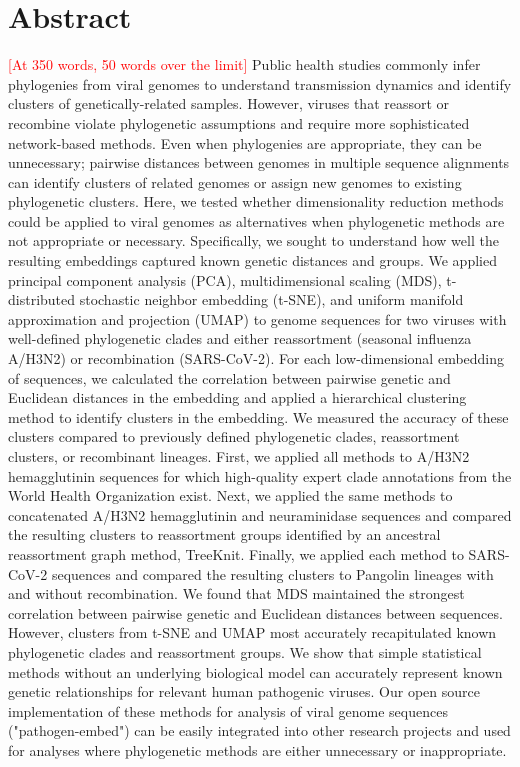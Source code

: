 \documentclass[10pt,letterpaper]{article}
\def\jhc#1{\textcolor{red}{[#1]}}
\begin{document}
\section*{Abstract}
\jhc{At 350 words, 50 words over the limit}
Public health studies commonly infer phylogenies from viral genomes to understand transmission dynamics and identify clusters of genetically-related samples.
However, viruses that reassort or recombine violate phylogenetic assumptions and require more sophisticated network-based methods.
Even when phylogenies are appropriate, they can be unnecessary; pairwise distances between genomes in multiple sequence alignments can identify clusters of related genomes or assign new genomes to existing phylogenetic clusters.
Here, we tested whether dimensionality reduction methods could be applied to viral genomes as alternatives when phylogenetic methods are not appropriate or necessary.
Specifically, we sought to understand how well the resulting embeddings captured known genetic distances and groups.
We applied principal component analysis (PCA), multidimensional scaling (MDS), t-distributed stochastic neighbor embedding (t-SNE), and uniform manifold approximation and projection (UMAP) to genome sequences for two viruses with well-defined phylogenetic clades and either reassortment (seasonal influenza A/H3N2) or recombination (SARS-CoV-2).
For each low-dimensional embedding of sequences, we calculated the correlation between pairwise genetic and Euclidean distances in the embedding and applied a hierarchical clustering method to identify clusters in the embedding.
We measured the accuracy of these clusters compared to previously defined phylogenetic clades, reassortment clusters, or recombinant lineages.
First, we applied all methods to A/H3N2 hemagglutinin sequences for which high-quality expert clade annotations from the World Health Organization exist.
Next, we applied the same methods to concatenated A/H3N2 hemagglutinin and neuraminidase sequences and compared the resulting clusters to reassortment groups identified by an ancestral reassortment graph method, TreeKnit.
Finally, we applied each method to SARS-CoV-2 sequences and compared the resulting clusters to Pangolin lineages with and without recombination.
We found that MDS maintained the strongest correlation between pairwise genetic and Euclidean distances between sequences.
However, clusters from t-SNE and UMAP most accurately recapitulated known phylogenetic clades and reassortment groups.
We show that simple statistical methods without an underlying biological model can accurately represent known genetic relationships for relevant human pathogenic viruses.
Our open source implementation of these methods for analysis of viral genome sequences ("pathogen-embed") can be easily integrated into other research projects and used for analyses where phylogenetic methods are either unnecessary or inappropriate.
\end{document}

